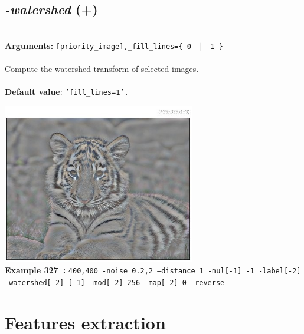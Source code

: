 \documentclass[a4paper,11pt,twoside]{book}
\begin{document}
\subsection{\emph{-watershed} (+)}\vspace*{-0.5em}
~\\\textbf{Arguments: } 
{\small \texttt{[priority\_image],\_fill\_lines=\{ 0 ~$|$~ 1 \}}}\\~\\
Compute the watershed transform of selected images.
~\\~\\\textbf{Default value}: {\small \texttt{'fill\_lines=1'.}}
\begin{center}\includegraphics[keepaspectratio=true,height=7cm,width=\textwidth]{img/gmic_def327.jpg}\\
{\footnotesize \textbf{Example 327~:} \texttt{400,400 -noise 0.2,2 --distance 1 -mul[-1] -1 -label[-2] -watershed[-2] [-1] -mod[-2] 256 -map[-2] 0 -reverse}}
\end{center}
\section{Features extraction}
\end{document}
